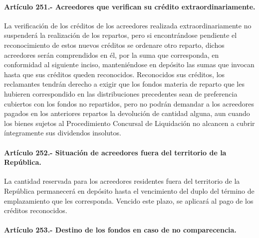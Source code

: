\documentclass[
]{book}
\begin{document}
\hypertarget{artuxedculo-251.--acreedores-que-verifican-su-cruxe9dito-extraordinariamente.}{%
\paragraph*{Artículo 251.- Acreedores que verifican su crédito extraordinariamente.}\label{artuxedculo-251.--acreedores-que-verifican-su-cruxe9dito-extraordinariamente.}}

La verificación de los créditos de los acreedores realizada extraordinariamente no suspenderá la realización de los repartos, pero si encontrándose pendiente el reconocimiento de estos nuevos créditos se ordenare otro reparto, dichos acreedores serán comprendidos en él, por la suma que corresponda, en conformidad al siguiente inciso, manteniéndose en depósito las sumas que invocan hasta que sus créditos queden reconocidos.
Reconocidos sus créditos, los reclamantes tendrán derecho a exigir que los fondos materia de reparto que les hubieren correspondido en las distribuciones precedentes sean de preferencia cubiertos con los fondos no repartidos, pero no podrán demandar a los acreedores pagados en los anteriores repartos la devolución de cantidad alguna, aun cuando los bienes sujetos al Procedimiento Concursal de Liquidación no alcancen a cubrir íntegramente sus dividendos insolutos.

\hypertarget{artuxedculo-252.--situaciuxf3n-de-acreedores-fuera-del-territorio-de-la-repuxfablica.}{%
\paragraph*{Artículo 252.- Situación de acreedores fuera del territorio de la República.}\label{artuxedculo-252.--situaciuxf3n-de-acreedores-fuera-del-territorio-de-la-repuxfablica.}}

La cantidad reservada para los acreedores residentes fuera del territorio de la República permanecerá en depósito hasta el vencimiento del duplo del término de emplazamiento que les corresponda. Vencido este plazo, se aplicará al pago de los créditos reconocidos.

\hypertarget{artuxedculo-253.--destino-de-los-fondos-en-caso-de-no-comparecencia.}{%
\paragraph*{Artículo 253.- Destino de los fondos en caso de no comparecencia.}\label{artuxedculo-253.--destino-de-los-fondos-en-caso-de-no-comparecencia.}}
\end{document}
